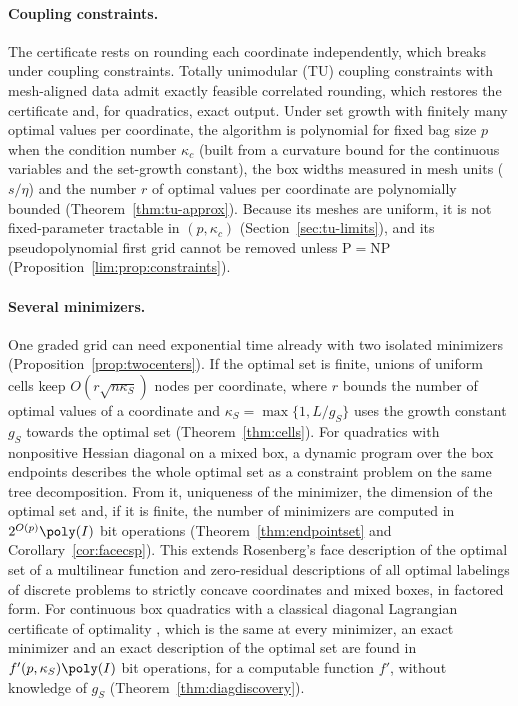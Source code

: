 \paragraph{Coupling constraints.}
The certificate rests on rounding each coordinate independently, which breaks
under coupling constraints. Totally unimodular (TU) coupling constraints with
mesh-aligned data admit exactly feasible correlated rounding, which restores
the certificate and, for quadratics, exact output. Under set growth with
finitely many optimal values per coordinate, the algorithm is polynomial for
fixed bag size $p$ when the condition number $\kappa_c$ (built from a
curvature bound for the continuous variables and the set-growth constant),
the box widths measured in mesh units ($s/\eta$) and the number $r$ of optimal values per coordinate are
polynomially bounded (Theorem~\ref{thm:tu-approx}). Because its meshes are
uniform, it is not fixed-parameter tractable in $(p,\kappa_c)$
(Section~\ref{sec:tu-limits}), and its pseudopolynomial first grid cannot be
removed unless P${}={}$NP (Proposition~\ref{lim:prop:constraints}).

\paragraph{Several minimizers.}
One graded grid can need exponential time already with two isolated
minimizers (Proposition~\ref{prop:twocenters}). If the optimal set is finite,
unions of uniform cells keep $O(r\sqrt{n\kappa_S})$ nodes per coordinate,
where $r$ bounds the number of optimal values of a coordinate and
$\kappa_S=\max\{1,L/g_S\}$ uses the growth constant $g_S$ towards the optimal
set (Theorem~\ref{thm:cells}). For quadratics with nonpositive Hessian
diagonal on a mixed box, a dynamic program over the box endpoints describes
the whole optimal set as a constraint problem on the same tree decomposition.
From it, uniqueness of the minimizer, the dimension of the optimal set and,
if it is finite, the number of minimizers are computed in
$2^{O(p)}\poly(I)$ bit operations
(Theorem~\ref{thm:endpointset} and Corollary~\ref{cor:facecsp}). This
extends Rosenberg's face description of the optimal set of a multilinear
function \cite{Rosenberg1972} and zero-residual descriptions of all optimal
labelings of discrete problems \cite{WainwrightJaakkolaWillsky2005,Werner2007}
to strictly concave coordinates and mixed boxes, in factored form. For
continuous box quadratics with a classical diagonal Lagrangian certificate of
optimality \cite{JeyakumarRubinovWu2006,LiWuQuan2015}, which is the same at
every minimizer, an exact minimizer and an exact description of the optimal
set are found in $f'(p,\kappa_S)\poly(I)$ bit operations, for a computable function
$f'$, without knowledge of $g_S$ (Theorem~\ref{thm:diagdiscovery}).

